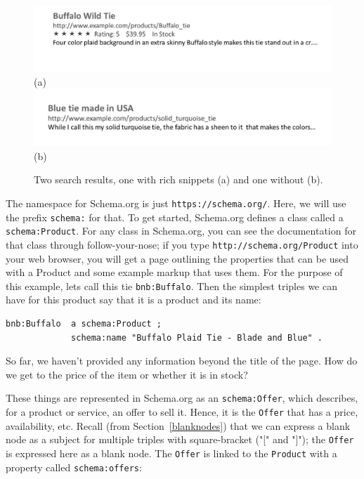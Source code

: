 \begin{figure}
    \centering
    \includegraphics[width=5.0in]{SWWOv3/media/ch4/WithRichSnippet.jpg}
    (a)
    \includegraphics[width=5.0in]{SWWOv3/media/ch4/WithoutRichSnippet.jpg}
    (b)
    \caption{Two search results, one with rich snippets (a) and one without (b). }
    \label{fig:ch4.RSReprise}
\end{figure}


The namespace for Schema.org is just \texttt{https://schema.org/}. Here, we will 
use the prefix \texttt{schema:} for that. To get started, Schema.org defines a class called 
a \texttt{schema:Product}.  For any class in Schema.org, you can see the 
documentation for that class through follow-your-nose; if you type 
\texttt{http://schema.org/Product} into your web browser, you will get a page outlining
the properties that can be used with a Product and some example markup that uses them. 
For the purpose of this example, lets call this tie \texttt{bnb:Buffalo}.  Then 
the simplest triples we can have for this product say that it is a product and its 
name:

\begin{lstlisting}
bnb:Buffalo  a schema:Product ;
             schema:name "Buffalo Plaid Tie - Blade and Blue" .
\end{lstlisting}

So far, we haven't provided any information beyond the title of the page.  How do we get
to the price of the item or whether it is in stock? 

These things are represented in Schema.org as an \texttt{schema:Offer}, which describes, 
for a product or service, an offer to sell it.  Hence, it is the \texttt{Offer} that has
a price, availability, etc.  Recall (from Section~\ref{blanknodes}) that we can express a blank node as a subject for multiple
triples with  square-bracket ("[" and "]"); the \texttt{Offer} is expressed here as a blank node. 
The \texttt{Offer} is linked to the \texttt{Product} with a 
property called \texttt{schema:offers}:

